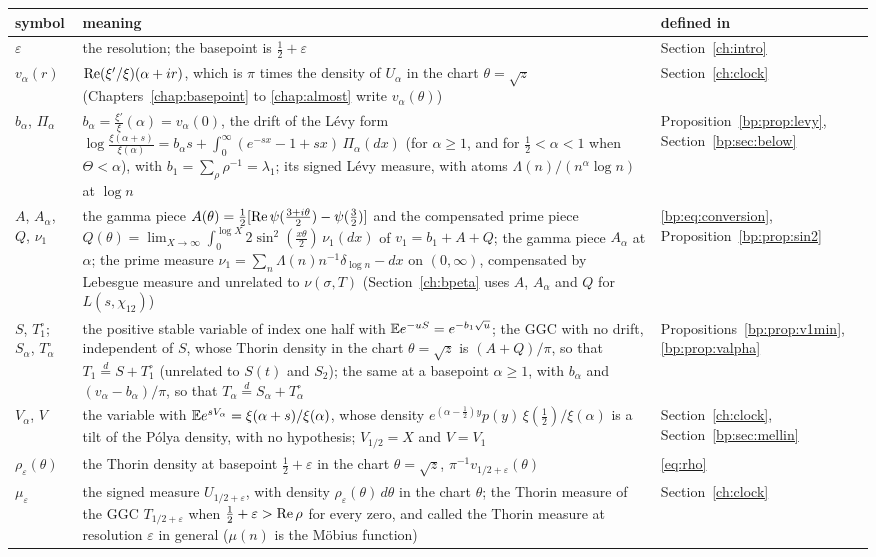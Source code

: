 {\small
\begin{longtable}{@{}p{}p{}p{}@{}}
\toprule
symbol & meaning & defined in\\
\midrule
\endhead
$\varepsilon$ & \raggedright the resolution; the basepoint is $\frac12+\varepsilon$ & \raggedright Section~\ref{ch:intro}\tabularnewline
$v_\alpha(r)$ & \raggedright $\operatorname{Re}(\xi'/\xi)(\alpha+ir)$, which is $\pi$ times the density of $U_\alpha$ in the chart $\theta=\sqrt z$ (Chapters~\ref{chap:basepoint} to \ref{chap:almost} write $v_\alpha(\theta)$) & \raggedright Section~\ref{ch:clock}\tabularnewline
$b_\alpha$, $\Pi_\alpha$ & \raggedright $b_\alpha=\frac{\xi'}\xi(\alpha)=v_\alpha(0)$, the drift of the L\'evy form $\log\frac{\xi(\alpha+s)}{\xi(\alpha)}=b_\alpha s+\int_0^\infty(e^{-sx}-1+sx)\,\Pi_\alpha(dx)$ (for $\alpha\ge1$, and for $\frac12<\alpha<1$ when $\Theta<\alpha$), with $b_1=\sum_\rho\rho^{-1}=\lambda_1$; its signed L\'evy measure, with atoms $\Lambda(n)/(n^\alpha\log n)$ at $\log n$ & \raggedright Proposition~\ref{bp:prop:levy}, Section~\ref{bp:sec:below}\tabularnewline
$A$, $A_\alpha$, $Q$, $\nu_1$ & \raggedright the gamma piece $A(\theta)=\frac12[\operatorname{Re}\psi(\frac{3+i\theta}2)-\psi(\frac32)]$ and the compensated prime piece $Q(\theta)=\lim_{X\to\infty}\int_0^{\log X}2\sin^2(\frac{x\theta}2)\,\nu_1(dx)$ of $v_1=b_1+A+Q$; the gamma piece $A_\alpha$ at $\alpha$; the prime measure $\nu_1=\sum_n\Lambda(n)n^{-1}\delta_{\log n}-dx$ on $(0,\infty)$, compensated by Lebesgue measure and unrelated to $\nu(\sigma,T)$ (Section~\ref{ch:bpeta} uses $A$, $A_\alpha$ and $Q$ for $L(s,\chi_{12})$) & \raggedright \eqref{bp:eq:conversion}, Proposition~\ref{bp:prop:sin2}\tabularnewline
$S$, $T_1^\circ$; $S_\alpha$, $T_\alpha^\circ$ & \raggedright the positive stable variable of index one half with $\mathbb{E} e^{-uS}=e^{-b_1\sqrt u}$; the GGC with no drift, independent of $S$, whose Thorin density in the chart $\theta=\sqrt z$ is $(A+Q)/\pi$, so that $T_1\stackrel d=S+T_1^\circ$ (unrelated to $S(t)$ and $S_2$); the same at a basepoint $\alpha\ge1$, with $b_\alpha$ and $(v_\alpha-b_\alpha)/\pi$, so that $T_\alpha\stackrel d=S_\alpha+T_\alpha^\circ$ & \raggedright Propositions~\ref{bp:prop:v1min}, \ref{bp:prop:valpha}\tabularnewline
$V_\alpha$, $V$ & \raggedright the variable with $\mathbb{E} e^{sV_\alpha}=\xi(\alpha+s)/\xi(\alpha)$, whose density $e^{(\alpha-\frac12)y}p(y)\,\xi(\frac12)/\xi(\alpha)$ is a tilt of the P\'olya density, with no hypothesis; $V_{1/2}=X$ and $V=V_1$ & \raggedright Section~\ref{ch:clock}, Section~\ref{bp:sec:mellin}\tabularnewline
$\rho_\varepsilon(\theta)$ & \raggedright the Thorin density at basepoint $\frac12+\varepsilon$ in the chart $\theta=\sqrt z$, $\pi^{-1}v_{1/2+\varepsilon}(\theta)$ & \raggedright \eqref{eq:rho}\tabularnewline
$\mu_\varepsilon$ & \raggedright the signed measure $U_{1/2+\varepsilon}$, with density $\rho_\varepsilon(\theta)\,d\theta$ in the chart $\theta$; the Thorin measure of the GGC $T_{1/2+\varepsilon}$ when ${\frac12+\varepsilon>\operatorname{Re}\rho}$ for every zero, and called the Thorin measure at resolution $\varepsilon$ in general ($\mu(n)$ is the M\"obius function) & \raggedright Section~\ref{ch:clock}\tabularnewline
\bottomrule
\end{longtable}}

